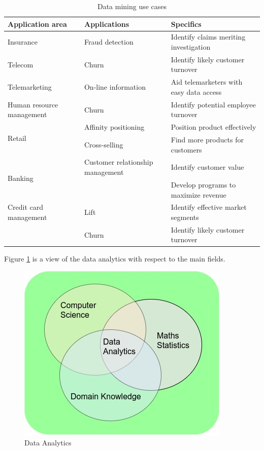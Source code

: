 \begin{table}[H]
	\centering
	\begin{tabular}{|p{4cm}|p{4cm}|l|}
		\hline
		\textbf{Application area} & \textbf{Applications} & \textbf{Specifics}\\
		\hline
		Insurance & Fraud detection & Identify claims meriting investigation\\
		\hline
		Telecom & Churn & Identify likely customer turnover\\
		\hline
		Telemarketing & On-line information & Aid telemarketers with easy data access\\
		\hline
		Human resource management & Churn & Identify potential employee turnover\\
		\hline
		\multirow{2}{4em}{Retail}  & Affinity positioning & Position product effectively\\
		& Cross-selling & Find more products for customers\\
		\hline
		\multirow{2}{4em}{Banking} & Customer relationship management & Identify customer value\\
		&& Develop programs to maximize revenue\\
		\hline
		Credit card management & Lift & Identify effective market segments\\
		& Churn & Identify likely customer turnover\\
		\hline
	\end{tabular}
	\caption{Data mining use cases}
	\label{tableDMusecase}
\end{table}
	
Figure \ref{fig:data-analytics} is a view of the data analytics with respect to the main fields.

\begin{figure}[H]
	\includegraphics[scale = 0.8]{figures/FlowChart.jpg}
	\centering
	\caption{Data Analytics}
	\label{fig:data-analytics}
\end{figure}
\FloatBarrier

